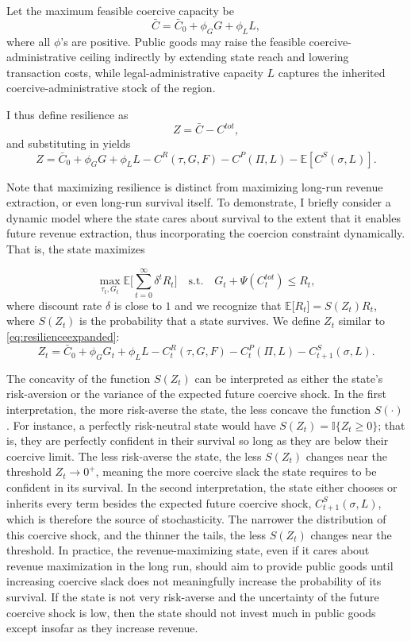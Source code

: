 \documentclass[12pt]{article}
\newcommand{\E}{\mathbb{E}}
\begin{document}
Let the maximum feasible coercive capacity be
\begin{equation}
\bar C = \bar C_0 + \phi_G G + \phi_L L,
\end{equation}
where all $\phi$'s are positive. Public goods may raise the feasible coercive-administrative ceiling indirectly by extending state reach and lowering transaction costs, while legal-administrative capacity $L$ captures the inherited coercive-administrative stock of the region.

I thus define resilience as
\begin{equation}
Z = \bar C - C^{tot},
\end{equation}
and substituting in yields
\begin{equation}\label{eq:resilienceexpanded}
Z = \bar C_0 + \phi_G G + \phi_L L - C^R(\tau,G,F) - C^P(\Pi,L) - \E[C^S(\sigma,L)].
\end{equation}

Note that maximizing resilience is distinct from maximizing long-run revenue extraction, or even long-run survival itself. To demonstrate, I briefly consider a dynamic model where the state cares about survival to the extent that it enables future revenue extraction, thus incorporating the coercion constraint dynamically. That is, the state maximizes

\[
\max_{\tau_t, G_t} \mathbb{E}\Bigg[\sum_{t=0}^{\infty}\delta^t R_t\Bigg] \quad \text{s.t.} \quad G_t + \Psi(C_t^{tot}) \le R_t,
\]
where discount rate $\delta$ is close to $1$ and we recognize that $\mathbb{E}\big[R_t\big] = S(Z_t) R_t$, where $S(Z_t)$ is the probability that a state survives. We define $Z_t$ similar to \ref{eq:resilienceexpanded}:
\[
Z_t = \bar C_0 + \phi_G G_t + \phi_L L - C^R_t(\tau,G,F) - C^P_t(\Pi,L) - C_{t+1}^S(\sigma,L).
\]

The concavity of the function $S(Z_t)$ can be interpreted as either the state's risk-aversion or the variance of the expected future coercive shock. In the first interpretation, the more risk-averse the state, the less concave the function $S(\cdot)$. For instance, a perfectly risk-neutral state would have $S(Z_t) = \mathbb{I}\{Z_t \ge 0\}$; that is, they are perfectly confident in their survival so long as they are below their coercive limit. The less risk-averse the state, the less $S(Z_t)$ changes near the threshold $Z_t \rightarrow 0^+$, meaning the more coercive slack the state requires to be confident in its survival. In the second interpretation, the state either chooses or inherits every term besides the expected future coercive shock, $C_{t+1}^S(\sigma,L)$, which is therefore the source of stochasticity. The narrower the distribution of this coercive shock, and the thinner the tails, the less $S(Z_t)$ changes near the threshold. In practice, the revenue-maximizing state, even if it cares about revenue maximization in the long run, should aim to provide public goods until increasing coercive slack does not meaningfully increase the probability of its survival. If the state is not very risk-averse and the uncertainty of the future coercive shock is low, then the state should not invest much in public goods except insofar as they increase revenue.
\end{document}

